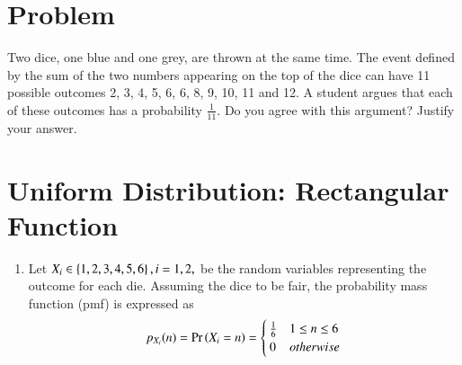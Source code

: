 \documentclass[journal,12pt,twocolumn]{IEEEtran}
\renewcommand\thesection{\arabic{section}}
\begin{document}
%



%
\fi

\section{Problem}
Two dice, one blue and one grey, are thrown at the same time.   The event defined by the sum of the two numbers appearing on the top of the dice can have 11 possible outcomes 2, 3, 4, 5, 6, 6, 8, 9, 10, 11 and 12.  A student argues that each of these outcomes has a probability $\frac{1}{11}$.  Do you agree with this argument?  Justify your answer.

\section{Uniform Distribution: Rectangular Function}

\renewcommand{\theequation}{\theenumi}
\renewcommand{\thefigure}{\theenumi}
\begin{enumerate}[label=\thesection.\arabic*.,ref=\thesection.\theenumi]

%

\item  Let $X_i \in \left\{1,2,3,4,5,6\right\}, i = 1,2,$ be the random variables representing the outcome for each die.  Assuming the dice to be fair, the probability mass function (pmf) is expressed as 
\begin{align}
\label{eq:dice_pmf_xi}
p_{X_i}(n) = \pr{X_i = n} = 
\begin{cases}
\frac{1}{6} & 1 \le n \le 6
\\
0 & otherwise
\end{cases}
\end{align}
\end{enumerate}
\end{document}
